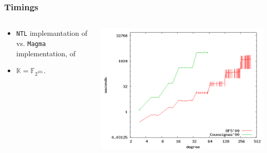\documentclass[10pt]{beamer}
\newcommand{\K}{\mathbb{K}}  %
\newcommand{\F}{\mathbb{F}}  %
\newcommand{\0}{\mathcal{O}}  %
\begin{document}

\begin{frame}
  \frametitle{Timings}

  
  \begin{columns}
    \begin{column}{0.4\textwidth}
      \begin{itemize}
      \item \texttt{NTL} implemantation of \cite{DFS09} vs.  \texttt{Magma}
        implementation, of \cite{Couveignes00}
      \item $\K = \F_{2^{101}}$.
      \end{itemize}
    \end{column}
    \begin{column}{0.6\textwidth}
             {\includegraphics[width=\textwidth]{2-101}}


\end{column}
\end{columns}
\end{frame}
\end{document}

